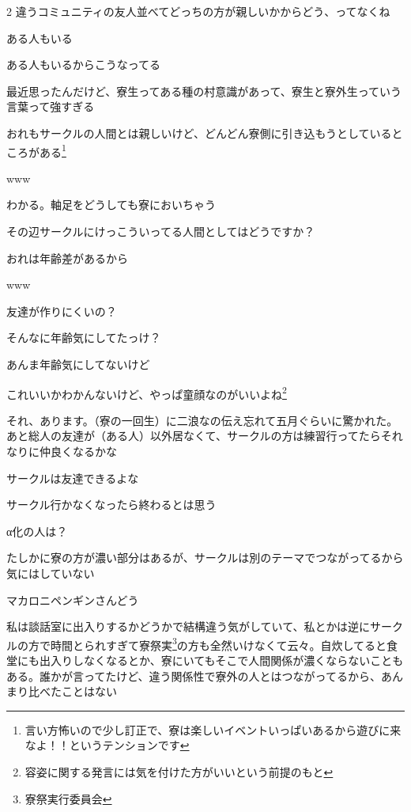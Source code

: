 \begin{multicols}{2}
 違うコミュニティの友人並べてどっちの方が親しいかからどう、ってなくね

 ある人もいる

 ある人もいるからこうなってる

 最近思ったんだけど、寮生ってある種の村意識があって、寮生と寮外生っていう言葉って強すぎる

 おれもサークルの人間とは親しいけど、どんどん寮側に引き込もうとしているところがある\footnote{言い方怖いので少し訂正で、寮は楽しいイベントいっぱいあるから遊びに来なよ！！というテンションです}

 www

 わかる。軸足をどうしても寮においちゃう

 その辺サークルにけっこういってる人間としてはどうですか？

 おれは年齢差があるから

 www

 友達が作りにくいの？

 そんなに年齢気にしてたっけ？

 あんま年齢気にしてないけど

 これいいかわかんないけど、やっぱ童顔なのがいいよね\footnote{容姿に関する発言には気を付けた方がいいという前提のもと}

 それ、あります。（寮の一回生）に二浪なの伝え忘れて五月ぐらいに驚かれた。あと総人の友達が（ある人）以外居なくて、サークルの方は練習行ってたらそれなりに仲良くなるかな

 サークルは友達できるよな

 サークル行かなくなったら終わるとは思う

 α化の人は？

 たしかに寮の方が濃い部分はあるが、サークルは別のテーマでつながってるから気にはしていない

 マカロニペンギンさんどう

 私は談話室に出入りするかどうかで結構違う気がしていて、私とかは逆にサークルの方で時間とられすぎて寮祭実\footnote{寮祭実行委員会}の方も全然いけなくて云々。自炊してると食堂にも出入りしなくなるとか、寮にいてもそこで人間関係が濃くならないこともある。誰かが言ってたけど、違う関係性で寮外の人とはつながってるから、あんまり比べたことはない


\end{multicols}
